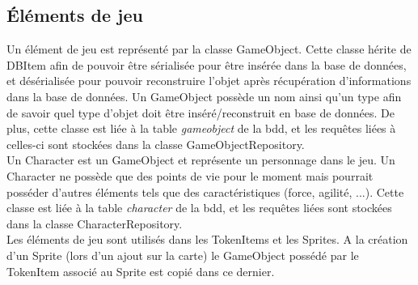 \subsection{Éléments de jeu}


Un élément de jeu est représenté par la classe GameObject. Cette classe hérite de DBItem afin de pouvoir être sérialisée pour être insérée dans la base de données, et désérialisée pour pouvoir reconstruire l'objet après récupération d'informations dans la base de données. Un GameObject possède un nom ainsi qu'un type afin de savoir quel type d'objet doit être inséré/reconstruit en base de données. De plus, cette classe est liée à la table \emph{gameobject} de la bdd, et les requêtes liées à celles-ci sont stockées dans la classe GameObjectRepository.\\

Un Character est un GameObject et représente un personnage dans le jeu. Un Character ne possède que des points de vie pour le moment mais pourrait posséder d'autres éléments tels que des caractéristiques (force, agilité, ...). Cette classe est liée à la table \emph{character} de la bdd, et les requêtes liées sont stockées dans la classe CharacterRepository.\\

Les éléments de jeu sont utilisés dans les TokenItems et les Sprites. A la création d'un Sprite (lors d'un ajout sur la carte) le GameObject possédé par le TokenItem associé au Sprite est copié dans ce dernier.\\

